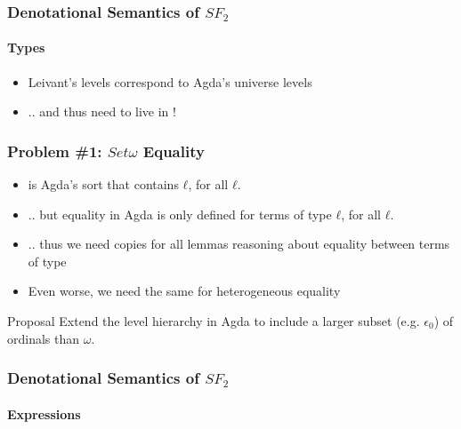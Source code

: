 \documentclass[dvipsnames,aspectratio=169,pdftex]{beamer}
\begin{document}
\begin{frame}
  \frametitle{Denotational Semantics of $SF_2$}
  \framesubtitle{Types}
  \TFTEnv
  \TFTSem
  \begin{itemize}
    \item Leivant’s levels correspond to Agda’s universe levels
    \item .. and thus  need to live in !
  \end{itemize}
\end{frame}

\begin{frame}
  \frametitle{Problem \#1: $Set \omega$ Equality}
  \NormalEqDef
  \vspace{-7.5mm} 
  \OmegaEqDef
  \vspace{-7.5mm} 
  \begin{itemize}
    \item {} is Agda’s sort that contains  $ℓ$, for all $ℓ$.
    \item .. but equality in Agda is only defined for terms of type  $ℓ$, for all $ℓ$.
    \item .. thus we need copies for all lemmas reasoning about equality between terms of type  
    \item Even worse, we need the same for heterogeneous equality
  \end{itemize}
  \begin{exampleblock}{Proposal}
    Extend the level hierarchy in Agda to include a larger subset (e.g. $\epsilon_0$) of ordinals than $\omega$.
  \end{exampleblock}
\end{frame}

\begin{frame}
  \frametitle{Denotational Semantics of $SF_2$}
  \framesubtitle{Expressions}
  \TFVEnv
  \TFExprSem
\end{frame}
\end{document}
